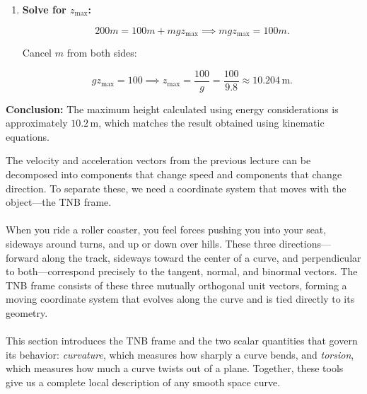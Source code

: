 \begin{example}
\begin{solution}
\begin{enumerate}
\begin{enumerate}
        \item \textbf{Solve for \( z_{\text{max}} \):}
        
        \[
        200 m = 100 m + m g z_{\text{max}} \implies m g z_{\text{max}} = 100 m.
        \]
        
        Cancel \( m \) from both sides:
        
        \[
        g z_{\text{max}} = 100 \implies z_{\text{max}} = \dfrac{100}{g} = \dfrac{100}{9.8} \approx 10.204 \, \text{m}.
        \]
        
    \end{enumerate}
    
    \textbf{Conclusion:} The maximum height calculated using energy considerations is approximately \( 10.2 \, \text{m} \), which matches the result obtained using kinematic equations.
    
\end{enumerate}
\end{solution}
\end{example}
\exampleline



\newpage

   

The velocity and acceleration vectors from the previous lecture can be decomposed into components that change speed and components that change direction. To separate these, we need a coordinate system that moves with the object---the TNB frame.\\ \\
\noindent When you ride a roller coaster, you feel forces pushing you into your seat, sideways around turns, and up or down over hills. These three directions---forward along the track, sideways toward the center of a curve, and perpendicular to both---correspond precisely to the tangent, normal, and binormal vectors. The TNB frame consists of these three mutually orthogonal unit vectors, forming a moving coordinate system that evolves along the curve and is tied directly to its geometry.\\ \\
\noindent This section introduces the TNB frame and the two scalar quantities that govern its behavior: \textit{curvature}, which measures how sharply a curve bends, and \textit{torsion}, which measures how much a curve twists out of a plane. Together, these tools give us a complete local description of any smooth space curve.

